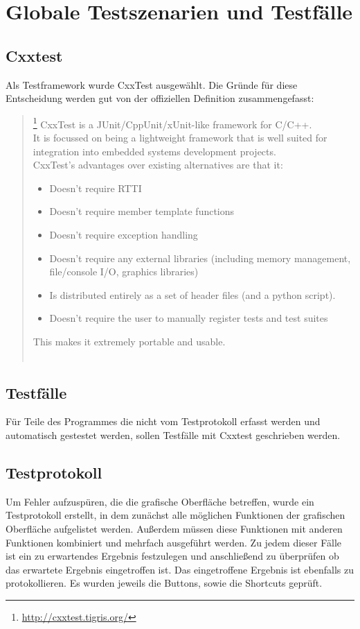 \section{Globale Testszenarien und Testfälle}
\subsection{Cxxtest}
Als Testframework wurde CxxTest ausgewählt. Die Gründe für diese Entscheidung werden gut von der offiziellen Definition zusammengefasst: 
\begin{quote}\footnote{\url{http://cxxtest.tigris.org/}}
    CxxTest is a JUnit/CppUnit/xUnit-like framework for C/C++.\ \\
    It is focussed on being a lightweight framework that is well suited for 
    integration into embedded systems development projects.\ \\
    CxxTest's advantages over existing alternatives are that it:
    \begin{itemize}
        \item Doesn't require RTTI
        \item Doesn't require member template functions
        \item Doesn't require exception handling
        \item Doesn't require any external libraries (including memory management, file/console I/O, graphics libraries)
        \item Is distributed entirely as a set of header files (and a python script).
        \item Doesn't require the user to manually register tests and test suites 
    \end{itemize}
    This makes it extremely portable and usable.\ \\ \\
\end{quote} 
\subsection{Testfälle}
Für Teile des Programmes die nicht vom Testprotokoll erfasst werden und automatisch gestestet werden, sollen Testfälle mit Cxxtest
geschrieben werden.   
\subsection{Testprotokoll}
Um Fehler aufzuspüren, die die grafische Oberfläche betreffen, wurde ein Testprotokoll erstellt, in dem zunächst
alle möglichen Funktionen der grafischen Oberfläche aufgelistet werden. Außerdem müssen diese Funktionen mit 
anderen Funktionen kombiniert und mehrfach ausgeführt werden. Zu jedem dieser Fälle ist ein zu erwartendes Ergebnis
festzulegen und anschließend zu überprüfen ob das erwartete Ergebnis eingetroffen ist. Das eingetroffene Ergebnis
ist ebenfalls zu protokollieren. Es wurden jeweils die Buttons, sowie die Shortcuts geprüft.



